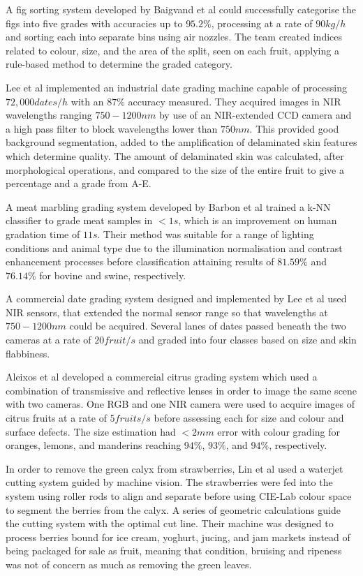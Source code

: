 \documentclass[fleqn,twoside]{article}
\begin{document}
A fig sorting system developed by Baigvand et al \cite{baigvand} could successfully categorise the figs into five grades with accuracies up to $95.2\%$, processing at a rate of $90kg/h$ and sorting each into separate bins using air nozzles. The team created indices related to colour, size, and the area of the split, seen on each fruit, applying a rule-based method to determine the graded category. 

Lee et al \cite{lee} implemented an industrial date grading machine capable of processing $72,000 dates/h$ with an $87\%$ accuracy measured. They acquired images in NIR wavelengths ranging $750-1200nm$ by use of an NIR-extended CCD camera and a high pass filter to block wavelengths lower than $750nm$. This provided good background segmentation, added to the amplification of delaminated skin features which determine quality. The amount of delaminated skin was calculated, after morphological operations, and compared to the size of the entire fruit to give a percentage and a grade from A-E. 

A meat marbling grading system developed by Barbon et al \cite{barbon} trained a k-NN classifier to grade meat samples in $<1s$, which is an improvement on human gradation time of $11s$. Their method was suitable for a range of lighting conditions and animal type due to the illumination normalisation and contrast enhancement processes before classification attaining results of $81.59\%$ and $76.14\%$ for bovine and swine, respectively. 

A commercial date grading system designed and implemented by Lee et al \cite{lee} used NIR sensors, that extended the normal sensor range so that wavelengths at $750-1200nm$ could be acquired. Several lanes of dates passed beneath the two cameras at a rate of $20 fruit/s$ and graded into four classes based on size and skin flabbiness. 

Aleixos et al \cite{aleixos} developed a commercial citrus grading system which used a combination of transmissive and reflective lenses in order to image the same scene with two cameras. One RGB and one NIR camera were used to acquire images of citrus fruits at a rate of $5 fruits/s$ before assessing each for size and colour and surface defects. The size estimation had $<2mm$ error with colour grading for oranges, lemons, and manderins reaching $94\%$, $93\%$, and $94\%$, respectively.

In order to remove the green calyx from strawberries, Lin et al \cite{lin} used a waterjet cutting system guided by machine vision. The strawberries were fed into the system using roller rods to align and separate before using CIE-Lab colour space to segment the berries from the calyx. A series of geometric calculations guide the cutting system with the optimal cut line. Their machine was designed to process berries bound for ice cream, yoghurt, jucing, and jam markets instead of being packaged for sale as fruit, meaning that condition, bruising and ripeness was not of concern as much as removing the green leaves.
\end{document}

